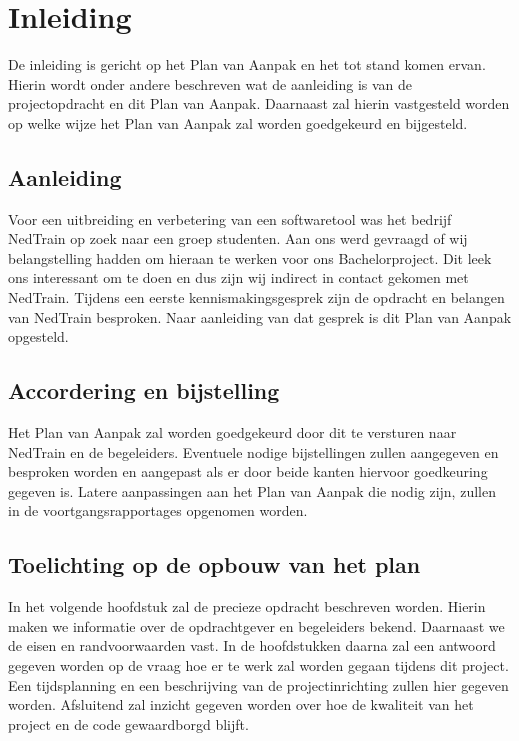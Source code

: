 \section{Inleiding}
De inleiding is gericht op het Plan van Aanpak en het tot stand komen ervan. Hierin wordt onder andere beschreven wat de aanleiding is van de projectopdracht en dit Plan van Aanpak. Daarnaast zal hierin vastgesteld worden op welke wijze het Plan van Aanpak zal worden goedgekeurd en bijgesteld.

\subsection{Aanleiding}
Voor een uitbreiding en verbetering van een softwaretool was het bedrijf NedTrain op zoek naar een groep studenten. Aan ons werd gevraagd of wij belangstelling hadden om hieraan te werken voor ons Bachelorproject. Dit leek ons interessant om te doen en dus zijn wij indirect in contact gekomen met NedTrain. Tijdens een eerste kennismakingsgesprek zijn de opdracht en belangen van NedTrain besproken. Naar aanleiding van dat gesprek is dit Plan van Aanpak opgesteld.

\subsection{Accordering en bijstelling}
Het Plan van Aanpak zal worden goedgekeurd door dit te versturen naar NedTrain en de begeleiders. Eventuele nodige bijstellingen zullen aangegeven en besproken worden en aangepast als er door beide kanten hiervoor goedkeuring gegeven is. Latere aanpassingen aan het Plan van Aanpak die nodig zijn, zullen in de voortgangsrapportages opgenomen worden.

\subsection{Toelichting op de opbouw van het plan}
In het volgende hoofdstuk zal de precieze opdracht beschreven worden. Hierin maken we informatie over de opdrachtgever en begeleiders bekend. Daarnaast we de eisen en randvoorwaarden vast. In de hoofdstukken daarna zal een antwoord gegeven worden op de vraag hoe er te werk zal worden gegaan tijdens dit project. Een tijdsplanning en een beschrijving van de projectinrichting zullen hier gegeven worden. Afsluitend zal inzicht gegeven worden over hoe de kwaliteit van het project en de code gewaardborgd blijft.